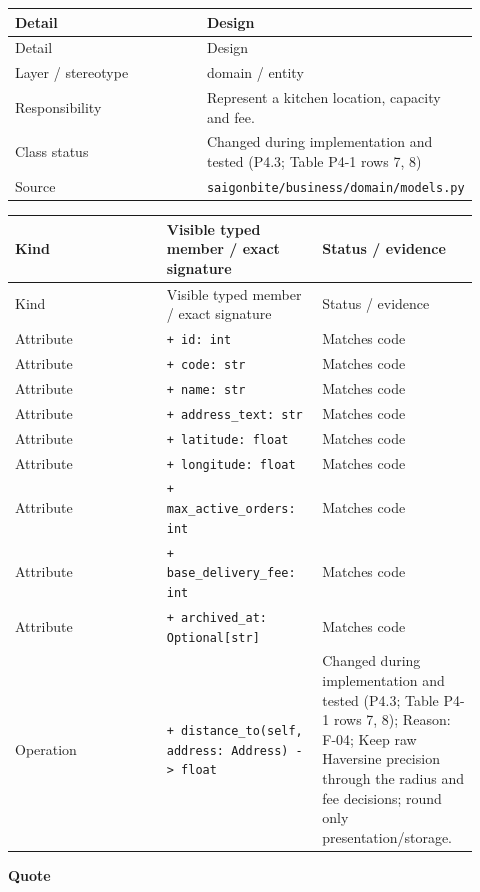 \begin{longtable}{>{\raggedright\arraybackslash}p{0.4600\linewidth}>{\raggedright\arraybackslash}p{0.4600\linewidth}}
Detail & Design \\
\hline\endfirsthead
Detail & Design \\
\hline\endhead
Layer / stereotype & domain / \guillemotleft{}entity\guillemotright{} \\
Responsibility & Represent a kitchen location, capacity and fee. \\
Class status & Changed during implementation and tested (P4.3; Table P4-1 rows 7, 8) \\
Source & \texttt{saigonbite/\allowbreak{}business/\allowbreak{}domain/\allowbreak{}models.\allowbreak{}py} \\
\end{longtable}
\begin{longtable}{>{\raggedright\arraybackslash}p{0.3067\linewidth}>{\raggedright\arraybackslash}p{0.3067\linewidth}>{\raggedright\arraybackslash}p{0.3067\linewidth}}
Kind & Visible typed member / exact signature & Status / evidence \\
\hline\endfirsthead
Kind & Visible typed member / exact signature & Status / evidence \\
\hline\endhead
Attribute & \texttt{+ id: int} & Matches code \\
Attribute & \texttt{+ code: str} & Matches code \\
Attribute & \texttt{+ name: str} & Matches code \\
Attribute & \texttt{+ address\_\allowbreak{}text: str} & Matches code \\
Attribute & \texttt{+ latitude: float} & Matches code \\
Attribute & \texttt{+ longitude: float} & Matches code \\
Attribute & \texttt{+ max\_\allowbreak{}active\_\allowbreak{}orders: int} & Matches code \\
Attribute & \texttt{+ base\_\allowbreak{}delivery\_\allowbreak{}fee: int} & Matches code \\
Attribute & \texttt{+ archived\_\allowbreak{}at: Optional[str]} & Matches code \\
Operation & \texttt{+ distance\_\allowbreak{}to(self, address: Address) -\textgreater{} float} & Changed during implementation and tested (P4.3; Table P4-1 rows 7, 8); Reason: F-04; Keep raw Haversine precision through the radius and fee decisions; round only presentation/storage. \\
\end{longtable}
\textbf{Quote}

